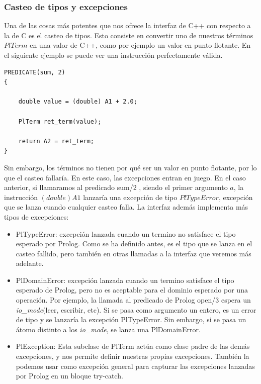 \documentclass[a4paper,12pt]{article}
\begin{document}
\subsubsection{Casteo de tipos y excepciones}

Una de las cosas más potentes que nos ofrece la interfaz de C++ con respecto a la de C es el casteo de tipos. Esto consiste en convertir uno de nuestros términos $PlTerm$ en una valor de C++, como por ejemplo un valor en punto flotante. En el siguiente ejemplo se puede ver una instrucción perfectamente válida.

\begin{lstlisting}[style=C++]
PREDICATE(sum, 2)
{
	
	double value = (double) A1 + 2.0;
	
	PlTerm ret_term(value);
	
	return A2 = ret_term;
}
\end{lstlisting}

Sin embargo, los términos no tienen por qué ser un valor en punto flotante, por lo que el casteo fallaría. En este caso, las excepciones entran en juego.
En el caso anterior, si llamaramos al predicado sum/2 , siendo el primer argumento $a$, la instrucción $(double) A1$ lanzaría una excepción de tipo $PlTypeError$, excepción que se lanza cuando cualquier casteo falla. La interfaz además implementa más tipos de excepciones:

\begin{itemize}
\item PlTypeError: excepción lanzada cuando un termino no satisface el tipo esperado por Prolog. Como se ha definido antes, es el tipo que se lanza en el casteo fallido, pero también en otras llamadas a la interfaz que veremos más adelante.
\item PlDomainError: excepción lanzada cuando un termino satisface el tipo esperado de Prolog, pero no es aceptable para el dominio esperado por una operación. Por ejemplo, la llamada al predicado de Prolog open/3 espera un \textit{io\_mode}(leer, escribir, etc). Si se pasa como argumento un entero, es un error de tipo y se lanzaría la excepción PlTypeError. Sin embargo, si se pasa un átomo distinto a los \textit{io\_mode}, se lanza una PlDomainError.
\item PlException: Esta subclase de PlTerm actúa como clase padre de las demás excepciones, y nos permite definir nuestras propias excepciones. También la podemos usar como excepción general para capturar las excepciones lanzadas por Prolog en un bloque try-catch.
\end{itemize}
\end{document}
